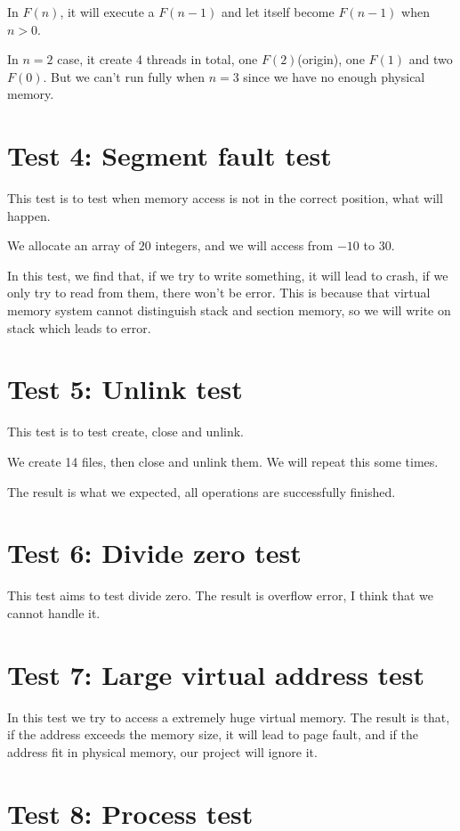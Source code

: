 \documentclass[11pt]{article}
\begin{document}
\begin{spacing}{1.1}
In $F(n)$, it will execute a $F(n-1)$ and let itself become $F(n-1)$ when $n > 0$.

In $n=2$ case, it create 4 threads in total, one $F(2)$(origin), one $F(1)$ and two $F(0)$. But we can't run fully when $n=3$ since we have no enough physical memory.  

\section{Test 4: Segment fault test}

This test is to test when memory access is not in the correct position, what will happen.

We allocate an array of $20$ integers, and we will access from $-10$ to $30$.

In this test, we find that, if we try to write something, it will lead to crash, if we only try to read from them, there won't be error. This is because that virtual memory system cannot distinguish stack and section memory, so we will write on stack which leads to error.

\section{Test 5: Unlink test}

This test is to test create, close and unlink.

We create 14 files, then close and unlink them. We will repeat this some times.

The result is what we expected, all operations are successfully finished.

\section{Test 6: Divide zero test}

This test aims to test divide zero. The result is overflow error, I think that we cannot handle it.

\section{Test 7: Large virtual address test}

In this test we try to access a extremely huge virtual memory. The result is that, if the address exceeds the memory size, it will lead to page fault, and if the address fit in physical memory, our project will ignore it.

\section{Test 8: Process test}


\end{spacing}
\end{document}
